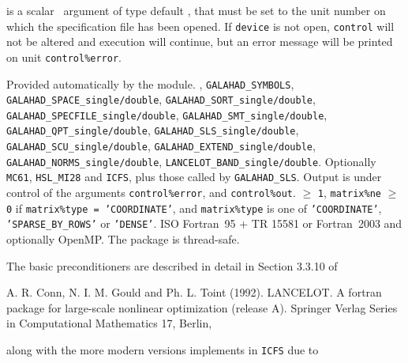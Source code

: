 \documentclass{galahad}
\begin{document}
\begin{description}

 is a scalar \intentin\ argument of type default \integer,
that must be set to the unit number on which the specification file
has been opened. If {\tt device} is not open, {\tt control} will
not be altered and execution will continue, but an error message
will be printed on unit {\tt control\%error}.

\end{description}


\galgeneral

\galworkspace Provided automatically by the module.
,
{\tt GALAHAD\-\_SYMBOLS},
{\tt GALAHAD\_SPACE\_single/double},
{\tt GALAHAD\_\-SORT\-\_single/double},
{\tt GALAHAD\_SPECFILE\_single/double},
{\tt GALAHAD\_SMT\_single/double},
{\tt GALAHAD\_QPT\-\_single\-/double},
{\tt GALAHAD\_SLS\_single/double},
{\tt GALA\-HAD\_SCU\_single/double},
{\tt GALAHAD\_EXTEND\_single/double},
{\tt GALAHAD\_NORMS\_single/double},
{\tt LANCELOT\_BAND\_single/double}.
\galroutines Optionally {\tt MC61}, {\tt HSL\_MI28} and {\tt ICFS},
plus those called by {\tt GALAHAD\_SLS}.
\galio Output is under control of the arguments
{\tt control\%error},
and {\tt control\%out}.
 $\geq$ {\tt 1},
{\tt matrix\%ne} $\geq$ {\tt 0} if {\tt matrix\%type = 'COORDINATE'},
and {\tt matrix\%type} is one of
{\tt 'COORDINATE'}, {\tt 'SPARSE\_BY\_ROWS'} or   {\tt 'DENSE'}.
\galportability ISO Fortran~95 + TR 15581 or Fortran~2003 and optionally OpenMP.
The package is thread-safe.


\galmethod

\noindent
The basic preconditioners are described in detail in Section 3.3.10 of
\vspace*{1mm}

\noindent
A. R. Conn, N. I. M. Gould and Ph. L. Toint (1992).
LANCELOT. A fortran package for large-scale nonlinear optimization
(release A). Springer Verlag Series in Computational Mathematics 17,
Berlin,

\noindent
along with the more modern versions implements in {\tt ICFS} due to
\vspace*{1mm}
\end{document}
